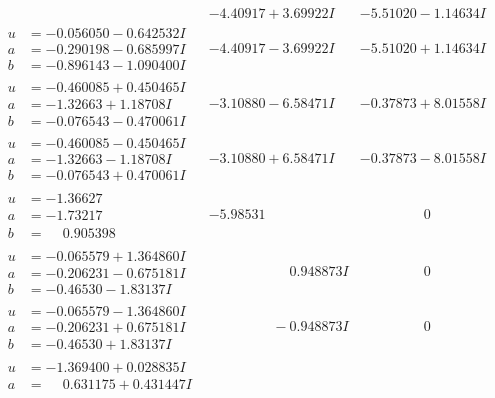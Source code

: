 \documentclass[1p]{elsarticle_modified}
\theoremstyle{definition}
\begin{document}
$$\begin{array}{c|c|c}
 & -4.40917 + 3.69922 I & -5.51020 - 1.14634 I \\ \hline\begin{aligned}
u &= -0.056050 - 0.642532 I \\
a &= -0.290198 - 0.685997 I \\
b &= -0.896143 - 1.090400 I\end{aligned}
 & -4.40917 - 3.69922 I & -5.51020 + 1.14634 I \\ \hline\begin{aligned}
u &= -0.460085 + 0.450465 I \\
a &= -1.32663 + 1.18708 I \\
b &= -0.076543 - 0.470061 I\end{aligned}
 & -3.10880 - 6.58471 I & -0.37873 + 8.01558 I \\ \hline\begin{aligned}
u &= -0.460085 - 0.450465 I \\
a &= -1.32663 - 1.18708 I \\
b &= -0.076543 + 0.470061 I\end{aligned}
 & -3.10880 + 6.58471 I & -0.37873 - 8.01558 I \\ \hline\begin{aligned}
u &= -1.36627\phantom{ +0.000000I} \\
a &= -1.73217\phantom{ +0.000000I} \\
b &= \phantom{-}0.905398\phantom{ +0.000000I}\end{aligned}
 & -5.98531\phantom{ +0.000000I} & \phantom{-0.000000 } 0 \\ \hline\begin{aligned}
u &= -0.065579 + 1.364860 I \\
a &= -0.206231 - 0.675181 I \\
b &= -0.46530 - 1.83137 I\end{aligned}
 & \phantom{-0.000000 -}0.948873 I & \phantom{-0.000000 } 0 \\ \hline\begin{aligned}
u &= -0.065579 - 1.364860 I \\
a &= -0.206231 + 0.675181 I \\
b &= -0.46530 + 1.83137 I\end{aligned}
 & \phantom{-0.000000 } -0.948873 I & \phantom{-0.000000 } 0 \\ \hline\begin{aligned}
u &= -1.369400 + 0.028835 I \\
a &= \phantom{-}0.631175 + 0.431447 I \\

\end{aligned}
\end{array}$$
\end{document}
